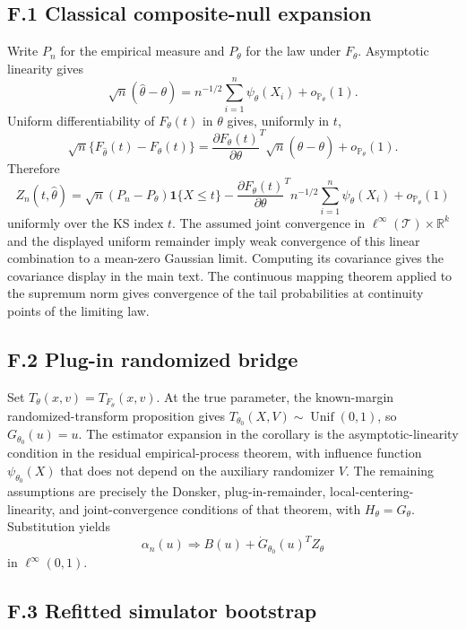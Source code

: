 \documentclass[12pt]{article}
\theoremstyle{remark}
\begin{document}
\subsection*{F.1 Classical composite-null expansion}

Write $P_n$ for the empirical measure and $P_\theta$ for the law under
$F_\theta$. Asymptotic linearity gives
\[
\sqrt n(\widehat\theta-\theta)
=n^{-1/2}\sum_{i=1}^n\psi_\theta(X_i)+o_{\mathbb P_\theta}(1).
\]
Uniform differentiability of $F_\theta(t)$ in $\theta$ gives, uniformly in
$t$,
\[
\sqrt n\{F_{\widehat\theta}(t)-F_\theta(t)\}
=\frac{\partial F_\theta(t)}{\partial\theta}^T
\sqrt n(\widehat\theta-\theta)+o_{\mathbb P_\theta}(1).
\]
Therefore
\[
Z_n(t,\widehat\theta)
=\sqrt n(P_n-P_\theta)\mathbf 1\{X\le t\}
-\frac{\partial F_\theta(t)}{\partial\theta}^T
n^{-1/2}\sum_{i=1}^n\psi_\theta(X_i)
+o_{\mathbb P_\theta}(1)
\]
uniformly over the KS index $t$. The assumed joint convergence in
$\ell^\infty(\mathcal T)\times\mathbb R^k$ and the displayed uniform remainder
imply weak convergence of this linear combination to a mean-zero Gaussian
limit. Computing its covariance gives the covariance display in the main text.
The continuous mapping theorem applied to the supremum norm gives convergence
of the tail probabilities at continuity points of the limiting law.

\subsection*{F.2 Plug-in randomized bridge}

Set $T_\theta(x,v)=T_{F_\theta}(x,v)$. At the true parameter, the known-margin
randomized-transform proposition gives
$T_{\theta_0}(X,V)\sim\operatorname{Unif}(0,1)$, so
$G_{\theta_0}(u)=u$. The estimator expansion in the corollary is the
asymptotic-linearity condition in the residual empirical-process theorem, with
influence function $\psi_{\theta_0}(X)$ that does not depend on the auxiliary
randomizer $V$. The remaining assumptions are precisely the Donsker,
plug-in-remainder, local-centering-linearity, and joint-convergence conditions
of that theorem, with $H_\theta=G_\theta$. Substitution yields
\[
\alpha_n(u)\Rightarrow B(u)+\dot G_{\theta_0}(u)^T Z_\theta
\]
in $\ell^\infty(0,1)$.

\subsection*{F.3 Refitted simulator bootstrap}
\end{document}

